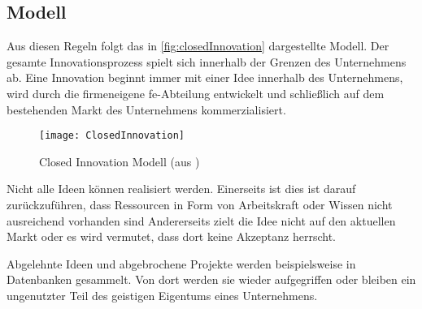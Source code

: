 \subsection{Modell}
Aus diesen Regeln folgt das in \autoref{fig:closedInnovation} dargestellte Modell.
Der gesamte Innovationsprozess spielt sich innerhalb der Grenzen des Unternehmens ab.
Eine Innovation beginnt immer mit einer Idee innerhalb des Unternehmens,
wird durch die firmeneigene \ac{fe}-Abteilung entwickelt
und schließlich auf dem bestehenden Markt des Unternehmens kommerzialisiert.

\begin{figure}[ht!]
    \centering
    \texttt{[image: ClosedInnovation]}
    \caption{Closed Innovation Modell (aus \cite[20]{herzog2011})}
    \label{fig:closedInnovation}
\end{figure}

Nicht alle Ideen können realisiert werden.
Einerseits ist dies ist darauf zurückzuführen, dass Ressourcen in Form von Arbeitskraft oder Wissen nicht ausreichend vorhanden sind
Andererseits zielt die Idee nicht auf den aktuellen Markt oder es wird vermutet, dass dort keine Akzeptanz herrscht.

Abgelehnte Ideen und abgebrochene Projekte werden beispielsweise in Datenbanken gesammelt.
Von dort werden sie wieder aufgegriffen
oder bleiben ein ungenutzter Teil des geistigen Eigentums eines Unternehmens.


